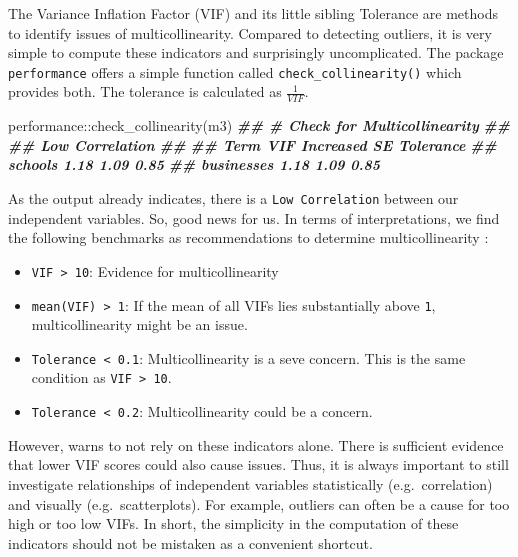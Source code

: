 \documentclass[
]{book}
\newenvironment{Shaded}{\begin{snugshade}}{\end{snugshade}}
\newcommand{\DocumentationTok}[1]{\textcolor[rgb]{0.56,0.35,0.01}{\textbf{\textit{#1}}}}
\newcommand{\FunctionTok}[1]{\textcolor[rgb]{0.00,0.00,0.00}{#1}}
\newcommand{\NormalTok}[1]{#1}
\newcommand{\SpecialCharTok}[1]{\textcolor[rgb]{0.00,0.00,0.00}{#1}}
\begin{document}
The Variance Inflation Factor (VIF) and its little sibling Tolerance are methods to identify issues of multicollinearity. Compared to detecting outliers, it is very simple to compute these indicators and surprisingly uncomplicated. The package \texttt{performance} offers a simple function called \texttt{check\_collinearity()} which provides both. The tolerance is calculated as \(\frac{1}{VIF}\).

\begin{Shaded}
\begin{Highlighting}[]
\NormalTok{performance}\SpecialCharTok{::}\FunctionTok{check\_collinearity}\NormalTok{(m3)}
\DocumentationTok{\#\# \# Check for Multicollinearity}
\DocumentationTok{\#\# }
\DocumentationTok{\#\# Low Correlation}
\DocumentationTok{\#\# }
\DocumentationTok{\#\#        Term  VIF Increased SE Tolerance}
\DocumentationTok{\#\#     schools 1.18         1.09      0.85}
\DocumentationTok{\#\#  businesses 1.18         1.09      0.85}
\end{Highlighting}
\end{Shaded}

As the output already indicates, there is a \texttt{Low\ Correlation} between our independent variables. So, good news for us. In terms of interpretations, we find the following benchmarks as recommendations to determine multicollinearity \citep{field2013discovering} :

\begin{itemize}
\item
  \texttt{VIF\ \textgreater{}\ 10}: Evidence for multicollinearity
\item
  \texttt{mean(VIF)\ \textgreater{}\ 1}: If the mean of all VIFs lies substantially above \texttt{1}, multicollinearity might be an issue.
\item
  \texttt{Tolerance\ \textless{}\ 0.1}: Multicollinearity is a seve concern. This is the same condition as \texttt{VIF\ \textgreater{}\ 10}.
\item
  \texttt{Tolerance\ \textless{}\ 0.2}: Multicollinearity could be a concern.
\end{itemize}

However, \citet{cohen2014applied} warns to not rely on these indicators alone. There is sufficient evidence that lower VIF scores could also cause issues. Thus, it is always important to still investigate relationships of independent variables statistically (e.g.~correlation) and visually (e.g.~scatterplots). For example, outliers can often be a cause for too high or too low VIFs. In short, the simplicity in the computation of these indicators should not be mistaken as a convenient shortcut.
\end{document}
